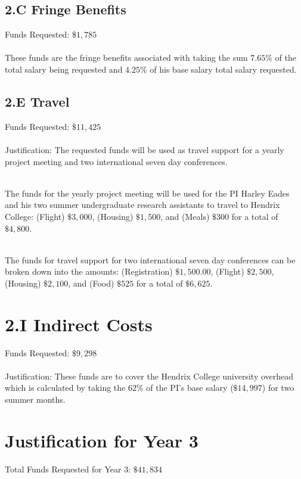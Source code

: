 \documentclass[11pt]{article}
\begin{document}
\subsection*{2.C Fringe Benefits}
\label{subsec:c_fringe_benefits}
Funds Requested: $\$1,785$\\ \ \\ These funds are the fringe benefits
associated with taking the sum $7.65\%$ of the total salary being
requested and $4.25\%$ of his base salary total salary requested.

\subsection*{2.E Travel}
\label{subsec:travel}
Funds Requested: $\$11,425$\\ \ \\ Justification: The requested funds
will be used as travel support for a yearly project meeting and two
international seven day conferences.

\ \\ The funds for the yearly project meeting will be used for the PI
Harley Eades and his two summer undergraduate research assistants to
travel to Hendrix College: (Flight) $\$3,000$, (Housing) $\$1,500$,
and (Meals) $\$300$ for a total of $\$4,800$.

\ \\ The funds for travel support for two international seven day
conferences can be broken down into the amounts: (Registration)
$\$1,500.00$, (Flight) $\$2,500$, (Housing) $\$2,100$, and (Food)
$\$525$ for a total of $\$6,625$.

\section*{2.I Indirect Costs}
\label{sec:2.i_indirect_costs}
Funds Requested: $\$9,298$\\ \ \\ Justification: These funds are to
cover the Hendrix College university overhead which is calculated by
taking the $62\%$ of the PI's base salary ($\$14,997$) for two
summer months.

\section{Justification for Year 3}
\label{sec:justification_for_year_3}
Total Funds Requested for Year 3: $\$41,834$\\
\vspace{-20px}
\end{document}

